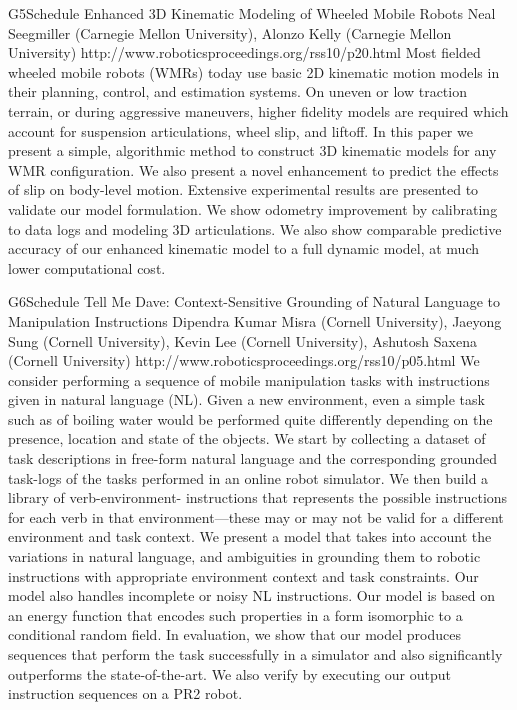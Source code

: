 \begin{spacing}{1.0}
\descriptionPaper
{G5}{Schedule}
{	
Enhanced 3D Kinematic Modeling of Wheeled Mobile Robots
}
{
Neal Seegmiller (Carnegie Mellon University), Alonzo Kelly (Carnegie Mellon University)
}
{
http://www.roboticsproceedings.org/rss10/p20.html
}
{
Most fielded wheeled mobile robots (WMRs) today use basic 2D kinematic motion models in their planning, control, and estimation systems. On uneven or low traction terrain, or during aggressive maneuvers, higher fidelity models are required which account for suspension articulations, wheel slip, and liftoff. In this paper we present a simple, algorithmic method to construct 3D kinematic models for any WMR configuration. We also present a novel enhancement to predict the effects of slip on body-level motion. Extensive experimental results are presented to validate our model formulation. We show odometry improvement by calibrating to data logs and modeling 3D articulations. We also show comparable predictive accuracy of our enhanced kinematic model to a full dynamic model, at much lower computational cost.
}



\descriptionPaper
{G6}{Schedule}
{	
Tell Me Dave: Context-Sensitive Grounding of Natural Language to Manipulation Instructions
}
{
Dipendra Kumar Misra (Cornell University), Jaeyong Sung (Cornell University), Kevin Lee (Cornell University), Ashutosh Saxena (Cornell University)
}
{
http://www.roboticsproceedings.org/rss10/p05.html
}
{
We consider performing a sequence of mobile manipulation tasks with instructions given in natural language (NL). Given a new environment, even a simple task such as of boiling water would be performed quite differently depending on the presence, location and state of the objects. We start by collecting a dataset of task descriptions in free-form natural language and the corresponding grounded task-logs of the tasks performed in an online robot simulator. We then build a library of verb-environment- instructions that represents the possible instructions for each verb in that environment—these may or may not be valid for a different environment and task context. We present a model that takes into account the variations in natural language, and ambiguities in grounding them to robotic instructions with appropriate environment context and task constraints. Our model also handles incomplete or noisy NL instructions. Our model is based on an energy function that encodes such properties in a form isomorphic to a conditional random field. In evaluation, we show that our model produces sequences that perform the task successfully in a simulator and also significantly outperforms the state-of-the-art. We also verify by executing our output instruction sequences on a PR2 robot.
}



\end{spacing}
